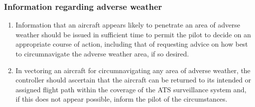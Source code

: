 \subsubsection{Information regarding adverse weather}

\begin{enumerate}
    \item Information that an aircraft appears likely to penetrate an area of adverse weather should be issued in sufficient time to permit the pilot to decide on an appropriate course of action, including that of requesting advice on how best to circumnavigate the adverse weather area, if so desired.
    \item In vectoring an aircraft for circumnavigating any area of adverse weather, the controller should ascertain that the aircraft can be returned to its intended or assigned flight path within the coverage of the ATS surveillance system and, if this does not appear possible, inform the pilot of the circumstances.
\end{enumerate}
